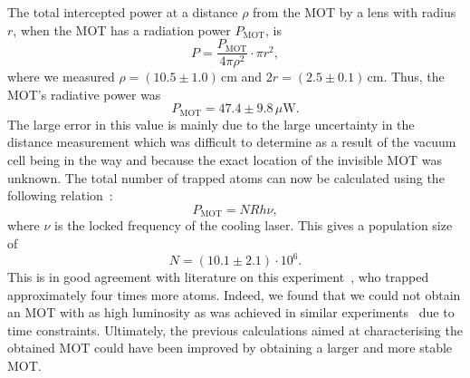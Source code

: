 \documentclass[twocolumn]{article}
\begin{document}
\par The total intercepted power at a distance $\rho$ from the MOT by a lens with radius $r$, when the MOT has a radiation power $P_{\text{MOT}}$, is 
\begin{equation}
P = \frac{P_{\text{MOT}}}{4 \pi \rho^2} \cdot \pi r^2, \nonumber
\end{equation}
where we measured $\rho = (10.5 \pm 1.0) \,$cm and $2r = (2.5\pm 0.1) \,$cm. Thus, the MOT's radiative power was
\begin{equation}
P_{\text{MOT}} = 47.4 \pm 9.8 \, \text{$\mu$W}. \nonumber
\end{equation}
The large error in this value is mainly due to the large uncertainty in the distance measurement which was difficult to determine as a result of the vacuum cell being in the way and because the exact location of the invisible MOT was unknown. The total number of trapped atoms can now be calculated using the following relation~\cite{Wieman}:
\begin{equation}
P_{\text{MOT}} = N R h \nu, \nonumber
\end{equation}
where $\nu$ is the locked frequency of the cooling laser. This gives a population size of
\begin{equation}
N = (10.1 \pm 2.1)\cdot 10^6. \nonumber
\end{equation}
This is in good agreement with literature on this experiment~\cite{Wieman}, who trapped approximately four times more atoms. Indeed, we found that we could not obtain an MOT with as high luminosity as was achieved in similar experiments~\cite{manual} due to time constraints. Ultimately, the previous calculations aimed at characterising the obtained MOT could have been improved by obtaining a larger and more stable MOT.
\end{document}
